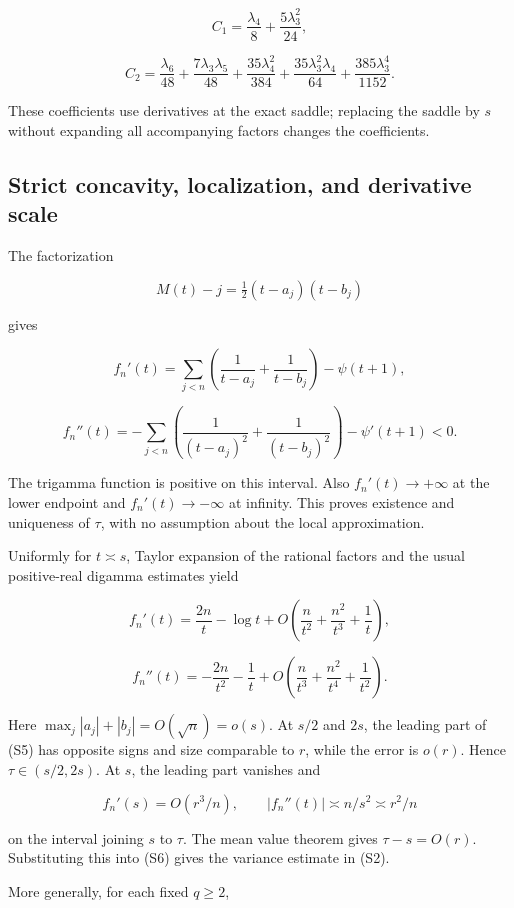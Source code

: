 \[
 C_1=\frac{\lambda_4}{8}+\frac{5\lambda_3^2}{24},
\]

\[
 C_2=\frac{\lambda_6}{48}+\frac{7\lambda_3\lambda_5}{48}
 +\frac{35\lambda_4^2}{384}+\frac{35\lambda_3^2\lambda_4}{64}
 +\frac{385\lambda_3^4}{1152}.
 \tag{S3}
\]

These coefficients use derivatives at the exact saddle; replacing the
saddle by \(s\) without expanding all accompanying factors changes the
coefficients.

\subsection{Strict concavity, localization, and derivative
scale}\label{tcl:strict-concavity-localization-and-derivative-scale}

The factorization

\[
 M(t)-j=\tfrac12(t-a_j)(t-b_j)
\]

gives

\[
 f_n'(t)=\sum_{j<n}\left(\frac1{t-a_j}+\frac1{t-b_j}\right)-\psi(t+1),
\]

\[
 f_n''(t)=-\sum_{j<n}\left(\frac1{(t-a_j)^2}+\frac1{(t-b_j)^2}\right)
 -\psi'(t+1)<0. \tag{S4}
\]

The trigamma function is positive on this interval. Also
\(f_n'(t)\to+\infty\) at the lower endpoint and \(f_n'(t)\to-\infty\) at
infinity. This proves existence and uniqueness of \(\tau\), with no
assumption about the local approximation.

Uniformly for \(t\asymp s\), Taylor expansion of the rational factors
and the usual positive-real digamma estimates yield

\[
 f_n'(t)=\frac{2n}{t}-\log t
     +O\left(\frac{n}{t^2}+\frac{n^2}{t^3}+\frac1t\right), \tag{S5}
\]

\[
 f_n''(t)=-\frac{2n}{t^2}-\frac1t
     +O\left(\frac{n}{t^3}+\frac{n^2}{t^4}+\frac1{t^2}\right). \tag{S6}
\]

Here \(\max_j|a_j|+|b_j|=O(\sqrt n)=o(s)\). At \(s/2\) and \(2s\), the
leading part of (S5) has opposite signs and size comparable to \(r\),
while the error is \(o(r)\). Hence \(\tau\in(s/2,2s)\). At \(s\), the
leading part vanishes and

\[
 f_n'(s)=O(r^3/n),\qquad |f_n''(t)|\asymp n/s^2\asymp r^2/n
\]

on the interval joining \(s\) to \(\tau\). The mean value theorem gives
\(\tau-s=O(r)\). Substituting this into (S6) gives the variance estimate
in (S2).

More generally, for each fixed \(q\ge2\),

